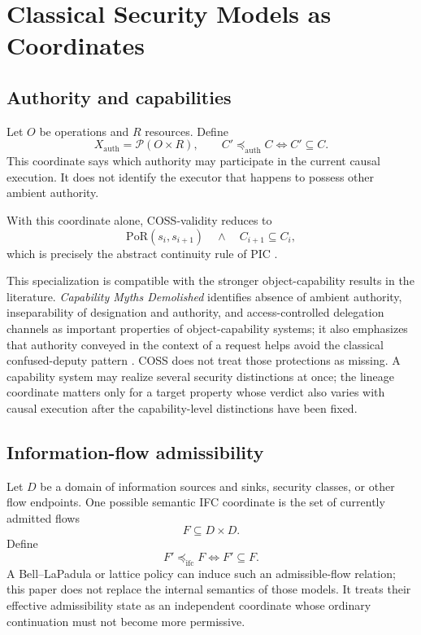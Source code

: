 \documentclass[10pt,twocolumn]{article}
\newcommand{\Model}{\textnormal{\textsc{COSS}}\xspace}
\newcommand{\PoR}{\mathrm{PoR}}
\newcommand{\powerset}{\mathcal{P}}
\begin{document}
\section{Classical Security Models as Coordinates}

\subsection{Authority and capabilities}

Let $O$ be operations and $R$ resources.  Define
\begin{equation}
  X_{\mathrm{auth}}=\powerset(O\times R),
  \qquad
  C'\preceq_{\mathrm{auth}}C
  \Longleftrightarrow C'\subseteq C.
\end{equation}
This coordinate says which authority may participate in the current causal
execution.  It does not identify the executor that happens to possess other
ambient authority.

With this coordinate alone, \Model-validity reduces to
\begin{equation}
  \PoR(s_i,s_{i+1})
  \quad\land\quad
  C_{i+1}\subseteq C_i,
\end{equation}
which is precisely the abstract continuity rule of PIC
\cite{gallo_poc2026}.

This specialization is compatible with the stronger object-capability results
in the literature.  \emph{Capability Myths Demolished} identifies absence of
ambient authority, inseparability of designation and authority, and
access-controlled delegation channels as important properties of
object-capability systems; it also emphasizes that authority conveyed in the
context of a request helps avoid the classical confused-deputy pattern
\cite{miller_yee_shapiro2003}.  \Model does not treat those protections as
missing.  A capability system may realize several security distinctions at
once; the lineage coordinate matters only for a target property whose verdict
also varies with causal execution after the capability-level distinctions have
been fixed.

\subsection{Information-flow admissibility}

Let $D$ be a domain of information sources and sinks, security classes, or
other flow endpoints.  One possible semantic IFC coordinate is the set of
currently admitted flows
\begin{equation}
  F\subseteq D\times D.
\end{equation}
Define
\begin{equation}
  F'\preceq_{\mathrm{ifc}}F
  \Longleftrightarrow F'\subseteq F.
  \label{eq:ifc-subset}
\end{equation}
A Bell--LaPadula or lattice policy can induce such an admissible-flow relation;
this paper does not replace the internal semantics of those models.  It treats
their effective admissibility state as an independent coordinate whose ordinary
continuation must not become more permissive.
\end{document}
